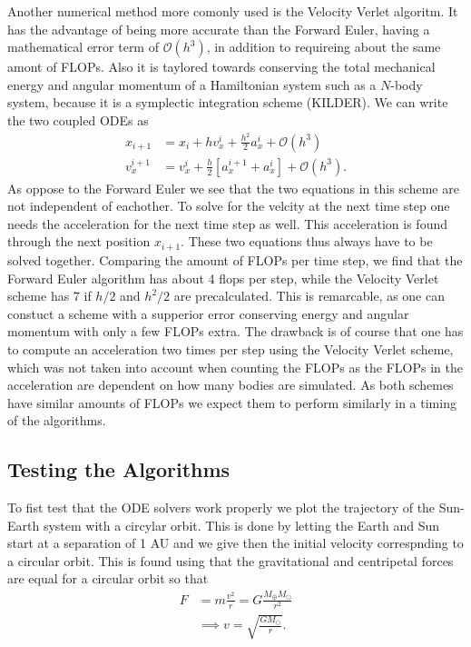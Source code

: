 \documentclass[twocolumn]{aastex62}
\begin{document}
Another numerical method more comonly used is the Velocity Verlet algoritm. It
has the advantage of being more accurate than the Forward Euler, having a
mathematical error term of $\mathcal{O}(h^3)$, in addition to requireing about
the same amont of FLOPs. Also it is taylored towards conserving the total
mechanical energy and angular momentum of a Hamiltonian system such as a
$N$-body system, because it is a symplectic integration scheme (KILDER). We can write the
two coupled ODEs as 
\begin{align}
    x_{i+1} &= x_i + hv_x^i + \frac{h^2}{2}a_x^i + \mathcal{O}(h^3)\\
    v_x^{i+1} &= v_x^i + \frac{h}{2}[a_x^{i+1} + a_x^i] + \mathcal{O}(h^3).
\end{align}
As oppose to the Forward Euler we see that the two equations in this scheme are
not independent of eachother. To solve for the velcity at the next time step one
needs the acceleration for the next time step as well. This acceleration is
found through the next position $x_{i+1}$. These two equations thus always have
to be solved together. Comparing the amount of FLOPs per time step, we find that
the Forward Euler algorithm has about 4 flops per step, while the Velocity
Verlet scheme has 7 if $h/2$ and $h^2/2$ are precalculated. This is remarcable,
as one can constuct a scheme with a supperior error conserving energy and
angular momentum with only a few FLOPs extra. The drawback is of course that one
has to compute an acceleration two times per step using the Velocity Verlet
scheme, which was not taken into account when counting the FLOPs as the FLOPs in
the acceleration are dependent on how many bodies are simulated.
As both schemes have similar amounts of FLOPs we expect them to perform
similarly in a timing of the algorithms.


\subsection{Testing the Algorithms} \label{subsec:algo_test}
To fist test that the ODE solvers work properly we plot the trajectory of the
Sun-Earth system with a circylar orbit. This is done by letting the Earth and
Sun start at a separation of 1 AU and we give then the initial velocity
correspnding to a circular orbit. This is found using that the gravitational and
centripetal forces are equal for a circular orbit so that 
\begin{align}
    F &= m\frac{v^2}{r} = G\frac{M_\oplus M_\odot}{r^2} \\
    &\implies v = \sqrt{\frac{GM_\odot}{r}}.
\end{align}
\end{document}
